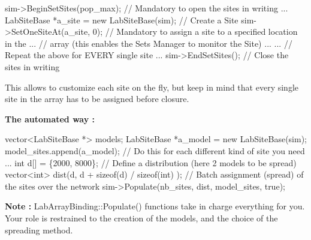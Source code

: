 \begin{DoxyCode}
sim->BeginSetSites(pop\_max);                                \textcolor{comment}{// Mandatory to open the sites in writing}
...
LabSiteBase *a\_site = \textcolor{keyword}{new} LabSiteBase(sim);                 \textcolor{comment}{// Create a Site}
sim->SetOneSiteAt(a\_site, 0);                               \textcolor{comment}{// Mandatory to assign a site to a specified
       location in the}
...                                                         \textcolor{comment}{// array (this enables the Sets Manager to
       monitor the Site)}
...
...                                                         \textcolor{comment}{// Repeat the above for EVERY single site}
...
sim->EndSetSites();                                         \textcolor{comment}{// Close the sites in writing}
\end{DoxyCode}


This allows to customize each site on the fly, but keep in mind that every single site in the array has to be assigned before closure.

{\bfseries The automated way \+:}


\begin{DoxyCode}
vector<LabSiteBase *> models;
LabSiteBase *a\_model = \textcolor{keyword}{new} LabSiteBase(sim);
model\_sites.append(a\_model);                                \textcolor{comment}{// Do this for each different kind of site you
       need}
...
int d[] = \{2000, 8000\};                                     \textcolor{comment}{// Define a distribution (here 2 models to be
       spread)}
vector<int> dist(d, d + \textcolor{keyword}{sizeof}(d) / \textcolor{keyword}{sizeof}(\textcolor{keywordtype}{int}) );          \textcolor{comment}{// Batch assignment (spread) of the sites over
       the network}
sim->Populate(nb\_sites, dist, model\_sites, \textcolor{keyword}{true});
\end{DoxyCode}


{\bfseries Note \+:} Lab\+Array\+Binding\+::\+Populate() functions take in charge everything for you. Your role is restrained to the creation of the models, and the choice of the spreading method. 

